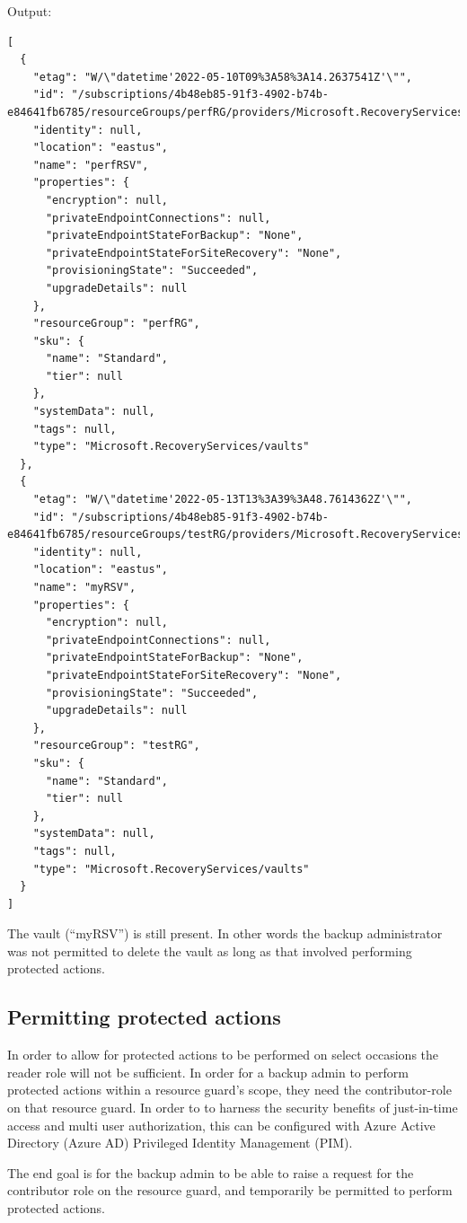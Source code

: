 Output:
\begin{verbatim}
[
  {
    "etag": "W/\"datetime'2022-05-10T09%3A58%3A14.2637541Z'\"",
    "id": "/subscriptions/4b48eb85-91f3-4902-b74b-e84641fb6785/resourceGroups/perfRG/providers/Microsoft.RecoveryServices/vaults/perfRSV",
    "identity": null,
    "location": "eastus",
    "name": "perfRSV",
    "properties": {
      "encryption": null,
      "privateEndpointConnections": null,
      "privateEndpointStateForBackup": "None",
      "privateEndpointStateForSiteRecovery": "None",
      "provisioningState": "Succeeded",
      "upgradeDetails": null
    },
    "resourceGroup": "perfRG",
    "sku": {
      "name": "Standard",
      "tier": null
    },
    "systemData": null,
    "tags": null,
    "type": "Microsoft.RecoveryServices/vaults"
  },
  {
    "etag": "W/\"datetime'2022-05-13T13%3A39%3A48.7614362Z'\"",
    "id": "/subscriptions/4b48eb85-91f3-4902-b74b-e84641fb6785/resourceGroups/testRG/providers/Microsoft.RecoveryServices/vaults/myRSV",
    "identity": null,
    "location": "eastus",
    "name": "myRSV",
    "properties": {
      "encryption": null,
      "privateEndpointConnections": null,
      "privateEndpointStateForBackup": "None",
      "privateEndpointStateForSiteRecovery": "None",
      "provisioningState": "Succeeded",
      "upgradeDetails": null
    },
    "resourceGroup": "testRG",
    "sku": {
      "name": "Standard",
      "tier": null
    },
    "systemData": null,
    "tags": null,
    "type": "Microsoft.RecoveryServices/vaults"
  }
]
\end{verbatim}

The vault (``myRSV'') is still present. In other words the backup administrator was not permitted to delete the vault as long as that involved performing protected actions.

\subsection{Permitting protected actions}
In order to allow for protected actions to be performed on select occasions the reader role will not be sufficient. In order for a backup admin to perform protected actions within a resource guard's scope, they need the contributor-role on that resource guard. In order to to harness the security benefits of just-in-time access and multi user authorization, this can be configured with Azure Active Directory (Azure AD) Privileged Identity Management (PIM). 

The end goal is for the backup admin to be able to raise a request for the contributor role on the resource guard, and temporarily be permitted to perform protected actions. 

